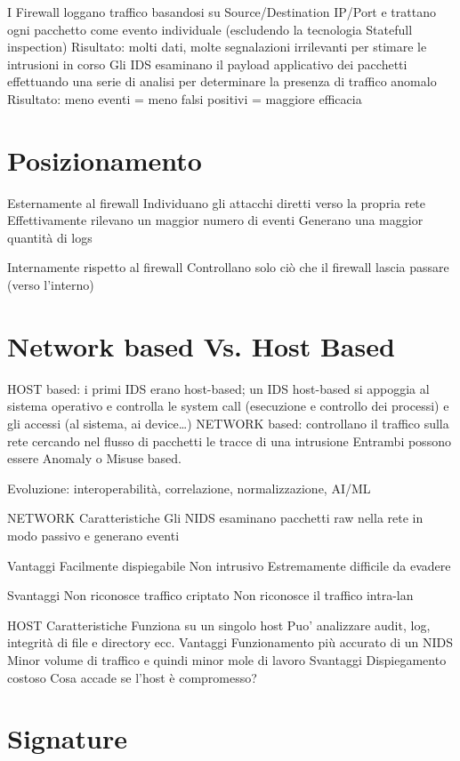 I Firewall loggano traffico basandosi su Source/Destination IP/Port e trattano ogni pacchetto come evento individuale (escludendo la tecnologia Statefull inspection)
Risultato: molti dati, molte segnalazioni irrilevanti per stimare le intrusioni in corso
Gli IDS esaminano il payload applicativo dei pacchetti effettuando una serie di analisi per determinare la presenza di traffico anomalo
Risultato: meno eventi = meno falsi positivi = maggiore efficacia

\section{Posizionamento}

Esternamente al firewall
Individuano gli attacchi diretti verso la propria rete
Effettivamente rilevano un maggior numero di eventi
Generano una maggior quantità di logs

Internamente rispetto al firewall
Controllano solo ciò che il firewall lascia passare (verso l’interno)

\section{Network based Vs. Host Based}

HOST based: i primi IDS erano host-based; un IDS host-based si appoggia al sistema operativo e controlla le system call (esecuzione e controllo dei processi) e gli accessi (al sistema, ai device…)
NETWORK based: controllano il traffico sulla rete cercando nel flusso di pacchetti le tracce di una intrusione
Entrambi possono essere Anomaly o Misuse based.

Evoluzione: interoperabilità, correlazione, normalizzazione, AI/ML


NETWORK
Caratteristiche
Gli NIDS esaminano pacchetti raw nella rete in modo passivo e generano eventi

Vantaggi
Facilmente dispiegabile
Non intrusivo
Estremamente difficile da evadere

Svantaggi
Non riconosce traffico criptato
Non riconosce il traffico intra-lan

HOST
Caratteristiche
Funziona su un singolo host
Puo’ analizzare audit, log, integrità di file e directory ecc.
Vantaggi
Funzionamento più accurato di un NIDS
Minor volume di traffico e quindi minor mole di lavoro
Svantaggi
Dispiegamento costoso
Cosa accade se l’host è compromesso?



\section{Signature}

